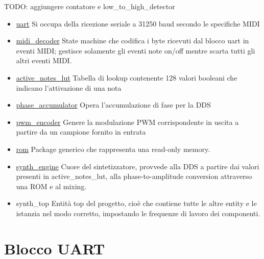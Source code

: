TODO: aggiungere contatore e low\_to\_high\_detector
\begin{itemize}
	\item \hyperref[sec:uart]{uart} Si occupa della ricezione seriale a 31250 baud secondo le specifiche MIDI
	\item \hyperref[sec:mididec]{midi\_decoder}  State machine che codifica i byte ricevuti dal blocco uart in eventi MIDI; gestisce solamente gli eventi note on/off
	mentre scarta tutti gli altri eventi MIDI.
	\item \hyperref[sec:noteslut]{active\_notes\_lut} Tabella di lookup contenente 128 valori booleani che indicano l'attivazione di una nota
	\item \hyperref[sec:phaseaccumulator]{phase\_accumulator} Opera l'accumulazione di fase per la DDS
	\item \hyperref[sec:pwmencoder]{pwm\_encoder} Genere la modulazione PWM corrispondente in uscita
	a partire da un campione fornito in entrata
	\item \hyperref[sec:rom]{rom} Package generico che rappresenta una read-only memory.
	\item \hyperref[sec:synthengine]{synth\_engine} Cuore del sintetizzatore, provvede alla DDS a partire dai valori presenti in active\_notes\_lut, alla phase-to-amplitude conversion attraverso una ROM e al mixing.
	\item synth\_top Entità top del progetto, cioè che contiene tutte le altre entity e le istanzia nel modo corretto, impostando le frequenze di lavoro dei componenti.
\end{itemize}

\section{Blocco UART}
\label{sec:uart}


\begin{center}
\end{center}

